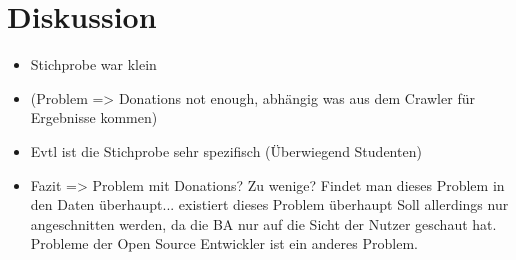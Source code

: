 \chapter{Diskussion}

\begin{itemize}
    \item Stichprobe war klein
    \item (Problem => Donations not enough, abhängig was aus dem Crawler für Ergebnisse kommen)
    \item Evtl ist die Stichprobe sehr spezifisch (Überwiegend Studenten)
    \item Fazit => Problem mit Donations? Zu wenige?
          Findet man dieses Problem in den Daten überhaupt... existiert dieses Problem überhaupt
          Soll allerdings nur angeschnitten werden, da die BA nur auf die Sicht der Nutzer geschaut hat.
          Probleme der Open Source Entwickler ist ein anderes Problem.
\end{itemize}